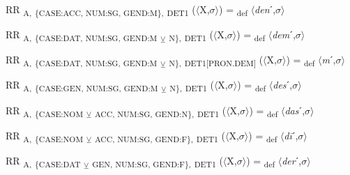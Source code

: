 {\begin{exe}
 RR \textsubscript{A,} \textsubscript{\{CASE:ACC, NUM:SG, GEND:M\},} \textsubscript{DET1} ($\langle$X,$\sigma $$\rangle$) = \textsubscript{def} $\langle$\textit{den}ˊ,$\sigma $$\rangle$
\end{exe}

\begin{exe}
 RR \textsubscript{A,} \textsubscript{\{CASE:DAT, NUM:SG, GEND:M} \textsubscript{${\veebar}$}\textsubscript{ N\},} \textsubscript{DET1} ($\langle$X,$\sigma $$\rangle$) = \textsubscript{def} $\langle$\textit{dem}ˊ,$\sigma $$\rangle$
\end{exe}

\begin{exe}
 RR \textsubscript{A,} \textsubscript{\{CASE:DAT, NUM:SG, GEND:M} \textsubscript{${\veebar}$}\textsubscript{ N\},} \textsubscript{DET1[PRON.DEM]} ($\langle$X,$\sigma $$\rangle$) = \textsubscript{def} $\langle$\textit{m}ˊ,$\sigma $$\rangle$
\end{exe}

\begin{exe}
 RR \textsubscript{A,} \textsubscript{\{CASE:GEN, NUM:SG, GEND:M} \textsubscript{${\veebar}$}\textsubscript{ N\},} \textsubscript{DET1} ($\langle$X,$\sigma $$\rangle$) = \textsubscript{def} $\langle$\textit{des}ˊ,$\sigma $$\rangle$
\end{exe}

\begin{exe}
 RR \textsubscript{A,} \textsubscript{\{CASE:NOM} \textsubscript{${\veebar}$}\textsubscript{ ACC, NUM:SG, GEND:N\},} \textsubscript{DET1} ($\langle$X,$\sigma $$\rangle$) = \textsubscript{def} $\langle$\textit{das}ˊ,$\sigma $$\rangle$
\end{exe}

\begin{exe}
 RR \textsubscript{A,} \textsubscript{\{CASE:NOM} \textsubscript{${\veebar}$}\textsubscript{ ACC, NUM:SG, GEND:F\},} \textsubscript{DET1} ($\langle$X,$\sigma $$\rangle$) = \textsubscript{def} $\langle$\textit{d\=i}ˊ,$\sigma $$\rangle$
\end{exe}

\begin{exe}
 RR \textsubscript{A,} \textsubscript{\{CASE:DAT} \textsubscript{${\veebar}$}\textsubscript{ GEN, NUM:SG, GEND:F\},} \textsubscript{DET1} ($\langle$X,$\sigma $$\rangle$) = \textsubscript{def} $\langle$\textit{der}ˊ,$\sigma $$\rangle$
\end{exe}

}

